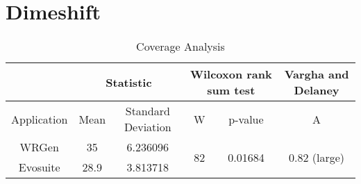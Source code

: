 \section{Dimeshift}
\begin{table}[H]
	\centering
	\caption{Coverage Analysis}
	\begin{adjustbox}{max width=\textwidth}
		\begin{tabular}{|c|c|c|c|c|c|}
		\hline
			& \multicolumn{2}{c|}{Statistic} & \multicolumn{2}{c|}{Wilcoxon rank sum test} & Vargha and Delaney    \\
		\hline
			Application & Mean   & Standard Deviation   & W                               & p-value                             & A            			         \\
		\hline
			WRGen       & 35     & 6.236096             & \multirow{2}{*}{82}             & \multirow{2}{*}{0.01684}            & \multirow{2}{*}{0.82 (large)}  \\
		\cline{1-3}
			Evosuite    & 28.9   & 3.813718             &                                 &                                     &            			   		 \\
		\hline
		\end{tabular}
	\end{adjustbox}
\end{table}

